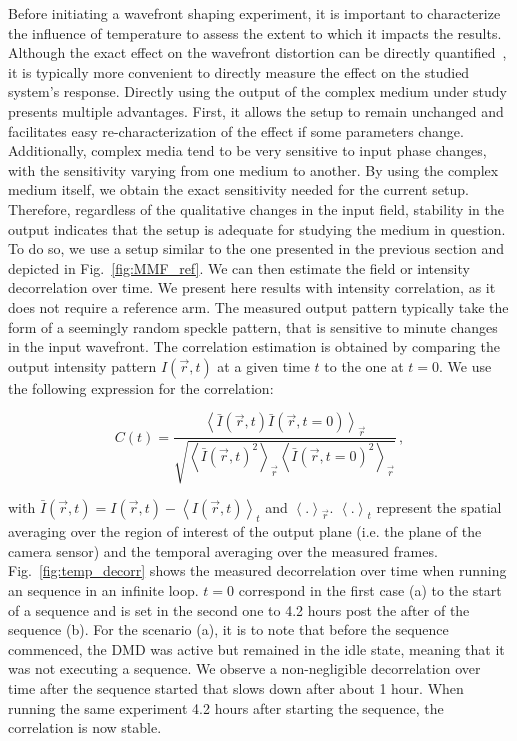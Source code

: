 \documentclass[12pt]{iopart}
\newcommand{\red}[1]{#1}
\begin{document}
Before initiating a wavefront shaping experiment,
it is important to characterize the influence of temperature
to assess the extent to which it impacts the results.
Although the exact effect on the wavefront distortion can be directly quantified~\cite{Rudolf2021thermal},
it is typically more convenient
to directly measure the effect on the studied system's response. 
\red{Directly using the output of the complex medium under study presents multiple advantages. First, it allows the setup to remain unchanged and facilitates easy re-characterization of the effect if some parameters change. Additionally, complex media tend to be very sensitive to input phase changes, with the sensitivity varying from one medium to another. By using the complex medium itself, we obtain the exact sensitivity needed for the current setup. Therefore, regardless of the qualitative changes in the input field, stability in the output indicates that the setup is adequate for studying the medium in question.}
To do so, we use a setup similar to the one presented in the previous section
and depicted in Fig.~\ref{fig:MMF_ref}.
We can then estimate the field or intensity decorrelation over time.
We present here results with intensity correlation, as it does not require a reference arm.
The measured output pattern typically take the form of a seemingly random speckle pattern,
that is sensitive to minute changes in the input wavefront.
The correlation estimation is obtained by comparing the output intensity pattern
$I(\vec{r}, t)$ at a given time $t$
to the one at $t=0$.
We use the following expression for the correlation:



\begin{equation}
  C(t) =
  \frac{
    \left\langle
    \bar{I}(\vec{r}, t) \bar{I}(\vec{r}, t=0)
    \right\rangle_{\vec{r}}
  }{
    \sqrt{
      \left\langle
      \bar{I}(\vec{r}, t)^2
      \right\rangle_{\vec{r}}
      \left\langle
      \bar{I}(\vec{r}, t=0)^2
      \right\rangle_{\vec{r}}
    }
  } \, ,
  \label{eq:temp_decorr}
\end{equation}




with $\bar{I}(\vec{r}, t) = I(\vec{r}, t) - \left\langle I(\vec{r}, t) \right\rangle_{t}$
and $\left\langle . \right\rangle_{\vec{r}}$.
$\left\langle . \right\rangle_{t}$
represent the spatial averaging over the region of interest
of the output plane (i.e. the plane of the camera sensor)
and the temporal averaging over the measured frames.
Fig.~\ref{fig:temp_decorr} shows the measured decorrelation
over time when running an sequence in an infinite loop.
$t=0$ correspond in the first case (a)
to the start of a sequence
and is set in the second one to
4.2 hours post the after of the sequence (b).
For the scenario (a), it is to note that before the sequence commenced,
the DMD was active but remained in the idle state,
meaning that it was not executing a sequence.
We observe a non-negligible decorrelation over time
after the sequence started
that slows down after about 1 hour.
When running the same experiment 4.2 hours after starting the sequence,
the correlation is now stable.\\
\end{document}
